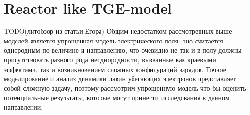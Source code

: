 \section{Reactor like TGE-model}\label{sec:thunderstorm/reactor}

TODO(литобзор из статьи Егора)
Общим недостатком рассмотренных выше моделей является упрощенная модель электрического поля: оно считается однородным по величине и направлению, что очевидно не так и в полу должны присутствовать разного рода неоднородности, вызванные как краевыми эффектами, так и возникновением сложных конфигураций зарядов. Точное моделирование и анализ динамики лавин убегающих электронов представляет собой сложную задачу, поэтому рассмотрим упрощенную модель что бы оценить потенциальные результаты, которые могут принести исследования в данном направлении. 

